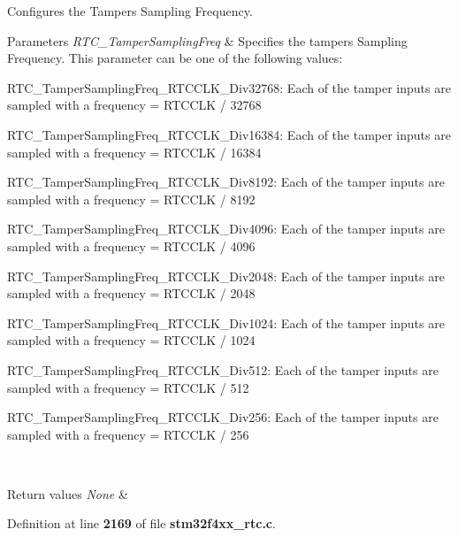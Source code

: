 Configures the Tampers Sampling Frequency. 


\begin{DoxyParams}{Parameters}
{\em R\+T\+C\+\_\+\+Tamper\+Sampling\+Freq} & Specifies the tampers Sampling Frequency. This parameter can be one of the following values\+: \begin{DoxyItemize}
\item R\+T\+C\+\_\+\+Tamper\+Sampling\+Freq\+\_\+\+R\+T\+C\+C\+L\+K\+\_\+\+Div32768\+: Each of the tamper inputs are sampled with a frequency = R\+T\+C\+C\+LK / 32768 \item R\+T\+C\+\_\+\+Tamper\+Sampling\+Freq\+\_\+\+R\+T\+C\+C\+L\+K\+\_\+\+Div16384\+: Each of the tamper inputs are sampled with a frequency = R\+T\+C\+C\+LK / 16384 \item R\+T\+C\+\_\+\+Tamper\+Sampling\+Freq\+\_\+\+R\+T\+C\+C\+L\+K\+\_\+\+Div8192\+: Each of the tamper inputs are sampled with a frequency = R\+T\+C\+C\+LK / 8192 \item R\+T\+C\+\_\+\+Tamper\+Sampling\+Freq\+\_\+\+R\+T\+C\+C\+L\+K\+\_\+\+Div4096\+: Each of the tamper inputs are sampled with a frequency = R\+T\+C\+C\+LK / 4096 \item R\+T\+C\+\_\+\+Tamper\+Sampling\+Freq\+\_\+\+R\+T\+C\+C\+L\+K\+\_\+\+Div2048\+: Each of the tamper inputs are sampled with a frequency = R\+T\+C\+C\+LK / 2048 \item R\+T\+C\+\_\+\+Tamper\+Sampling\+Freq\+\_\+\+R\+T\+C\+C\+L\+K\+\_\+\+Div1024\+: Each of the tamper inputs are sampled with a frequency = R\+T\+C\+C\+LK / 1024 \item R\+T\+C\+\_\+\+Tamper\+Sampling\+Freq\+\_\+\+R\+T\+C\+C\+L\+K\+\_\+\+Div512\+: Each of the tamper inputs are sampled with a frequency = R\+T\+C\+C\+LK / 512 \item R\+T\+C\+\_\+\+Tamper\+Sampling\+Freq\+\_\+\+R\+T\+C\+C\+L\+K\+\_\+\+Div256\+: Each of the tamper inputs are sampled with a frequency = R\+T\+C\+C\+LK / 256 \end{DoxyItemize}
\\
\hline
\end{DoxyParams}

\begin{DoxyRetVals}{Return values}
{\em None} & \\
\hline
\end{DoxyRetVals}


Definition at line \textbf{ 2169} of file \textbf{ stm32f4xx\+\_\+rtc.\+c}.


